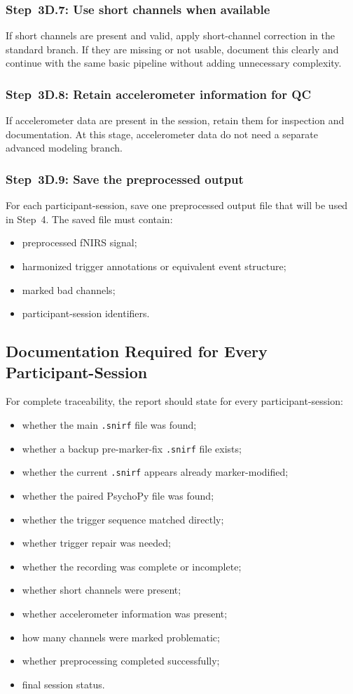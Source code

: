 \documentclass[11pt]{article}
\begin{document}
\subsubsection{Step~3D.7: Use short channels when available}
If short channels are present and valid, apply short-channel correction in the standard branch.
If they are missing or not usable, document this clearly and continue with the same basic pipeline
without adding unnecessary complexity.

\subsubsection{Step~3D.8: Retain accelerometer information for QC}
If accelerometer data are present in the session, retain them for inspection and documentation.
At this stage, accelerometer data do not need a separate advanced modeling branch.

\subsubsection{Step~3D.9: Save the preprocessed output}
For each participant-session, save one preprocessed output file that will be used in Step~4.
The saved file must contain:
\begin{itemize}
    \item preprocessed fNIRS signal;
    \item harmonized trigger annotations or equivalent event structure;
    \item marked bad channels;
    \item participant-session identifiers.
\end{itemize}

\subsection{Documentation Required for Every Participant-Session}
For complete traceability, the report should state for every participant-session:
\begin{itemize}
    \item whether the main \texttt{.snirf} file was found;
    \item whether a backup pre-marker-fix \texttt{.snirf} file exists;
    \item whether the current \texttt{.snirf} appears already marker-modified;
    \item whether the paired PsychoPy file was found;
    \item whether the trigger sequence matched directly;
    \item whether trigger repair was needed;
    \item whether the recording was complete or incomplete;
    \item whether short channels were present;
    \item whether accelerometer information was present;
    \item how many channels were marked problematic;
    \item whether preprocessing completed successfully;
    \item final session status.
\end{itemize}
\end{document}
